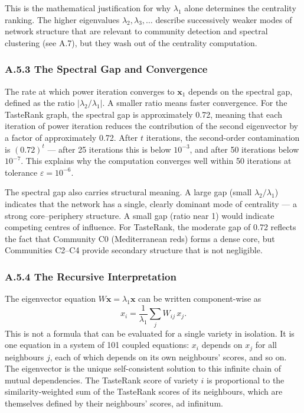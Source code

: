 \documentclass[11pt]{article}
\begin{document}
This is the mathematical justification for why $\lambda_1$ alone determines the centrality ranking. The higher eigenvalues $\lambda_2, \lambda_3, \ldots$ describe successively weaker modes of network structure that are relevant to community detection and spectral clustering (see A.7), but they wash out of the centrality computation.

\subsubsection*{A.5.3 The Spectral Gap and Convergence}
The rate at which power iteration converges to $\mathbf{x}_1$ depends on the spectral gap, defined as the ratio $|\lambda_2 / \lambda_1|$. A smaller ratio means faster convergence. For the TasteRank graph, the spectral gap is approximately 0.72, meaning that each iteration of power iteration reduces the contribution of the second eigenvector by a factor of approximately 0.72. After $t$ iterations, the second-order contamination is $(0.72)^t$ --- after 25 iterations this is below $10^{-3}$, and after 50 iterations below $10^{-7}$. This explains why the computation converges well within 50 iterations at tolerance $\varepsilon = 10^{-6}$.

The spectral gap also carries structural meaning. A large gap (small $\lambda_2 / \lambda_1$) indicates that the network has a single, clearly dominant mode of centrality --- a strong core--periphery structure. A small gap (ratio near 1) would indicate competing centres of influence. For TasteRank, the moderate gap of 0.72 reflects the fact that Community C0 (Mediterranean reds) forms a dense core, but Communities C2--C4 provide secondary structure that is not negligible.

\subsubsection*{A.5.4 The Recursive Interpretation}
The eigenvector equation $W \mathbf{x} = \lambda_1 \mathbf{x}$ can be written component-wise as
\[
x_i = \frac{1}{\lambda_1} \sum_j W_{ij}\, x_j.
\]
This is not a formula that can be evaluated for a single variety in isolation. It is one equation in a system of 101 coupled equations: $x_i$ depends on $x_j$ for all neighbours $j$, each of which depends on its own neighbours' scores, and so on. The eigenvector is the unique self-consistent solution to this infinite chain of mutual dependencies. The TasteRank score of variety $i$ is proportional to the similarity-weighted sum of the TasteRank scores of its neighbours, which are themselves defined by their neighbours' scores, ad infinitum.
\end{document}
